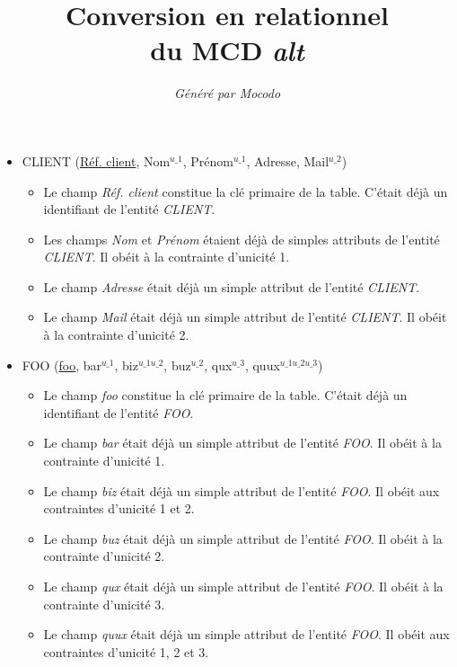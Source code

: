 \documentclass[a4paper]{article}
\title{Conversion en relationnel\\du MCD \emph{alt}}
\author{\emph{Généré par Mocodo}}
\newcommand{\relat}[1]{\textsc{#1}}
\newcommand{\attr}[1]{#1}
\newcommand{\prim}[1]{\uline{#1}}
\begin{document}
\maketitle

\begin{itemize}
  \item \relat{CLIENT} (\prim{Réf. client}, \attr{Nom}$^{u\_1}$, \attr{Prénom}$^{u\_1}$, \attr{Adresse}, \attr{Mail}$^{u\_2}$)
  \begin{itemize}
    \item Le champ \emph{Réf. client} constitue la clé primaire de la table. C'était déjà un identifiant de l'entité \emph{CLIENT}.
    \item Les champs \emph{Nom} et \emph{Prénom} étaient déjà de simples attributs de l'entité \emph{CLIENT}. Il obéit à la contrainte d'unicité 1.
    \item Le champ \emph{Adresse} était déjà un simple attribut de l'entité \emph{CLIENT}.
    \item Le champ \emph{Mail} était déjà un simple attribut de l'entité \emph{CLIENT}. Il obéit à la contrainte d'unicité 2.
  \end{itemize}

  \item \relat{FOO} (\prim{foo}, \attr{bar}$^{u\_1}$, \attr{biz}$^{u\_1 u\_2}$, \attr{buz}$^{u\_2}$, \attr{qux}$^{u\_3}$, \attr{quux}$^{u\_1 u\_2 u\_3}$)
  \begin{itemize}
    \item Le champ \emph{foo} constitue la clé primaire de la table. C'était déjà un identifiant de l'entité \emph{FOO}.
    \item Le champ \emph{bar} était déjà un simple attribut de l'entité \emph{FOO}. Il obéit à la contrainte d'unicité 1.
    \item Le champ \emph{biz} était déjà un simple attribut de l'entité \emph{FOO}. Il obéit aux contraintes d'unicité 1 et 2.
    \item Le champ \emph{buz} était déjà un simple attribut de l'entité \emph{FOO}. Il obéit à la contrainte d'unicité 2.
    \item Le champ \emph{qux} était déjà un simple attribut de l'entité \emph{FOO}. Il obéit à la contrainte d'unicité 3.
    \item Le champ \emph{quux} était déjà un simple attribut de l'entité \emph{FOO}. Il obéit aux contraintes d'unicité 1, 2 et 3.
  \end{itemize}


\end{itemize}
\end{document}
